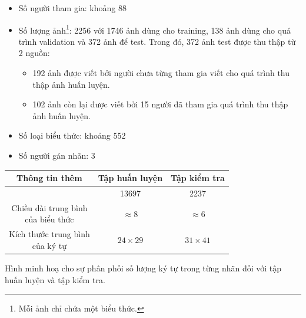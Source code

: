 \documentclass[a4paper]{article}
\theoremstyle{definition}
\begin{document}
	\begin{itemize}
		\item Số người tham gia: khoảng 88 
		\item Số lượng ảnh\footnote{Mỗi ảnh chỉ chứa một biểu thức.}:  2256 với 1746 ảnh dùng cho training, 138 ảnh dùng cho quá trình validation và 372 ảnh để test.
		Trong đó, 372 ảnh test được thu thập từ 2 nguồn:
		\begin{itemize}
		 	\item 192 ảnh được viết bởi người chưa từng tham gia viết cho quá trình thu thập ảnh huấn luyện.
		 	\item 102 ảnh còn lại được viết bởi 15 người đã tham gia quá trình thu thập ảnh huấn luyện.
		\end{itemize}
		\item Số loại biểu thức: khoảng 552
		\item Số  người gán nhãn: 3
	\end{itemize}
	\begin{center}
		\begin{tabular}{||c | c | c ||} 
			\hline
			 Thông tin thêm & Tập huấn luyện & Tập kiểm tra\\[0.5ex] 
			\hline\hline
			\makecell{Tổng số ký tự} & 13697 & 2237 \\
			\hline
			\makecell{Chiều dài trung bình\\ của biểu thức} &$\approx{8}$  &$\approx{6}$\\
			\hline
			\makecell{Kích thước trung bình\\ của ký tự}& $24\times29$&$31\times41$\\
			\hline
		\end{tabular}
	\end{center}
	Hình minh hoạ cho sự phân phối số lượng ký tự trong từng nhãn đối với tập huấn luyện và tập kiểm tra.
\end{document}
